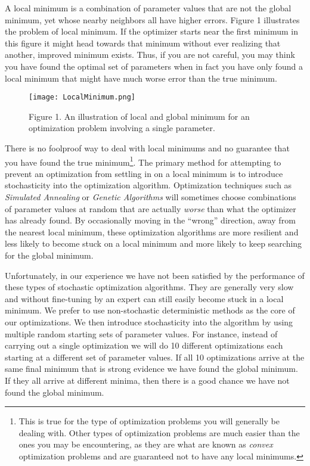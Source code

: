 \documentclass[]{memoir}
\makeatletter
\def\maxwidth{\ifdim\Gin@nat@width>\linewidth\linewidth
\else\Gin@nat@width\fi}
\let\Oldincludegraphics\includegraphics
\renewcommand{\includegraphics}[1]{\Oldincludegraphics[width=\maxwidth]{#1}}
\makeatother
\begin{document}
A local minimum is a combination of parameter values that are not the
global minimum, yet whose nearby neighbors all have higher errors.
Figure 1 illustrates the problem of local minimum. If the optimizer
starts near the first minimum in this figure it might head towards that
minimum without ever realizing that another, improved minimum exists.
Thus, if you are not careful, you may think you have found the optimal
set of parameters when in fact you have only found a local minimum that
might have much worse error than the true minimum.

\begin{figure}[htbp]
\centering
\texttt{[image: LocalMinimum.png]}
\caption{Figure 1. An illustration of local and global minimum for an
optimization problem involving a single parameter.}
\end{figure}

There is no foolproof way to deal with local minimums and no guarantee
that you have found the true minimum\footnote{This is true for the type
  of optimization problems you will generally be dealing with. Other
  types of optimization problems are much easier than the ones you may
  be encountering, as they are what are known as \emph{convex}
  optimization problems and are guaranteed not to have any local
  minimums.}. The primary method for attempting to prevent an
optimization from settling in on a local minimum is to introduce
stochasticity into the optimization algorithm. Optimization techniques
such as \emph{Simulated Annealing} or \emph{Genetic Algorithms} will
sometimes choose combinations of parameter values at random that are
actually \emph{worse} than what the optimizer has already found. By
occasionally moving in the ``wrong'' direction, away from the nearest
local minimum, these optimization algorithms are more resilient and less
likely to become stuck on a local minimum and more likely to keep
searching for the global minimum.

Unfortunately, in our experience we have not been satisfied by the
performance of these types of stochastic optimization algorithms. They
are generally very slow and without fine-tuning by an expert can still
easily become stuck in a local minimum. We prefer to use non-stochastic
deterministic methods as the core of our optimizations. We then
introduce stochasticity into the algorithm by using multiple random
starting sets of parameter values. For instance, instead of carrying out
a single optimization we will do 10 different optimizations each
starting at a different set of parameter values. If all 10 optimizations
arrive at the same final minimum that is strong evidence we have found
the global minimum. If they all arrive at different minima, then there
is a good chance we have not found the global minimum.
\end{document}
